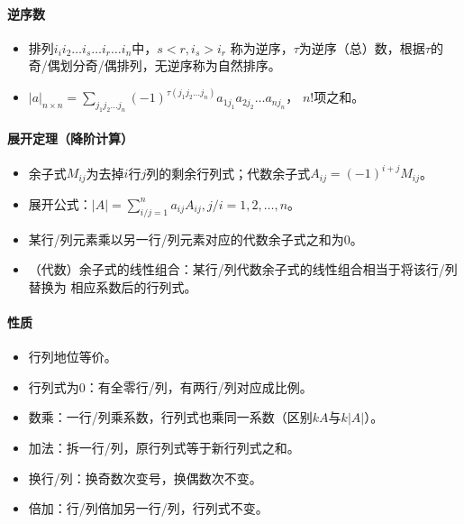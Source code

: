 \documentclass[
12pt, %
a4paper, 
oneside, %
headinclude,footinclude, %
]{scrartcl}
\begin{document}
\paragraph{逆序数}
\begin{itemize}
\item 排列$ i_i i_2 \dots i_s \dots i_r \dots i_n $中，$ s < r, i_s > i_r $
称为逆序，$ \tau $为逆序（总）数，根据$ \tau $的奇/偶划分奇/偶排列，无逆序称为自然排序。
\item $ |a|_{n \times n} = \sum_{j_1 j_2 \dots j_n}(-1)^{\tau(j_1 j_2 \dots j_n)} a_{1 j_{1}} a_{2 j_{2}} \dots a_{n j_{n}} $，
$ n! $项之和。
\end{itemize}
\paragraph{展开定理（降阶计算）}
\begin{itemize}
\item 余子式$ M_{ij} $为去掉$ i $行$ j $列的剩余行列式；代数余子式$ A_{ij} = (-1)^{i+j} M_{ij} $。
\item 展开公式：$ |A| = \sum_{i/j = 1}^n a_{ij}A_{ij}, j/i = 1, 2, \dots, n $。
\item 某行/列元素乘以另一行/列元素对应的代数余子式之和为$ 0 $。
\item （代数）余子式的线性组合：某行/列代数余子式的线性组合相当于将该行/列替换为
相应系数后的行列式。
\end{itemize}
\paragraph{性质}
\begin{itemize}
\item 行列地位等价。
\item 行列式为$ 0 $：有全零行/列，有两行/列对应成比例。
\item 数乘：一行/列乘系数，行列式也乘同一系数（区别$ kA $与$ k|A| $）。
\item 加法：拆一行/列，原行列式等于新行列式之和。
\item 换行/列：换奇数次变号，换偶数次不变。
\item 倍加：行/列倍加另一行/列，行列式不变。   
\end{itemize}
\end{document}
